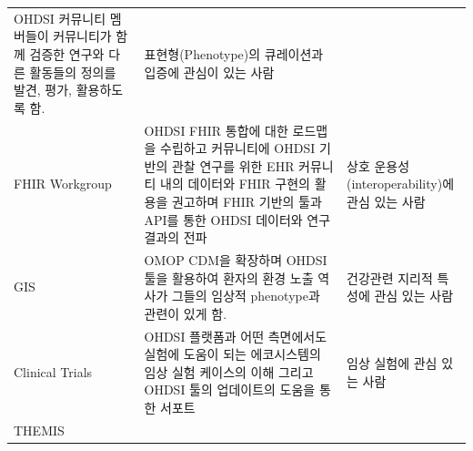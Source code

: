 \documentclass[11pt]{book}
\theoremstyle{definition}
\theoremstyle{definition}
\theoremstyle{definition}
\theoremstyle{remark}
\begin{document}
\begin{longtable}[]{@{}lll@{}}
\begin{minipage}[t]{0.30\columnwidth}
OHDSI 커뮤니티 멤버들이 커뮤니티가 함께 검증한 연구와 다른 활동들의
정의를 발견, 평가, 활용하도록 함.\strut
\end{minipage} & \begin{minipage}[t]{0.15\columnwidth}\raggedright\strut
표현형(Phenotype)의 큐레이션과 입증에 관심이 있는 사람\strut
\end{minipage}\tabularnewline
\begin{minipage}[t]{0.11\columnwidth}\raggedright\strut
FHIR Workgroup\strut
\end{minipage} & \begin{minipage}[t]{0.30\columnwidth}\raggedright\strut
OHDSI FHIR 통합에 대한 로드맵을 수립하고 커뮤니티에 OHDSI 기반의 관찰
연구를 위한 EHR 커뮤니티 내의 데이터와 FHIR 구현의 활용을 권고하며 FHIR
기반의 툴과 API를 통한 OHDSI 데이터와 연구 결과의 전파\strut
\end{minipage} & \begin{minipage}[t]{0.15\columnwidth}\raggedright\strut
상호 운용성(interoperability)에 관심 있는 사람\strut
\end{minipage}\tabularnewline
\begin{minipage}[t]{0.11\columnwidth}\raggedright\strut
GIS\strut
\end{minipage} & \begin{minipage}[t]{0.30\columnwidth}\raggedright\strut
OMOP CDM을 확장하며 OHDSI 툴을 활용하여 환자의 환경 노출 역사가 그들의
임상적 phenotype과 관련이 있게 함.\strut
\end{minipage} & \begin{minipage}[t]{0.15\columnwidth}\raggedright\strut
건강관련 지리적 특성에 관심 있는 사람\strut
\end{minipage}\tabularnewline
\begin{minipage}[t]{0.11\columnwidth}\raggedright\strut
Clinical Trials\strut
\end{minipage} & \begin{minipage}[t]{0.30\columnwidth}\raggedright\strut
OHDSI 플랫폼과 어떤 측면에서도 실험에 도움이 되는 에코시스템의 임상 실험
케이스의 이해 그리고 OHDSI 툴의 업데이트의 도움을 통한 서포트\strut
\end{minipage} & \begin{minipage}[t]{0.15\columnwidth}\raggedright\strut
임상 실험에 관심 있는 사람\strut
\end{minipage}\tabularnewline
\begin{minipage}[t]{0.11\columnwidth}\raggedright\strut
THEMIS\strut
\end{minipage} & \begin{minipage}[t]{0.30\columnwidth}\raggedright\strut

\end{minipage}
\end{longtable}
\end{document}
